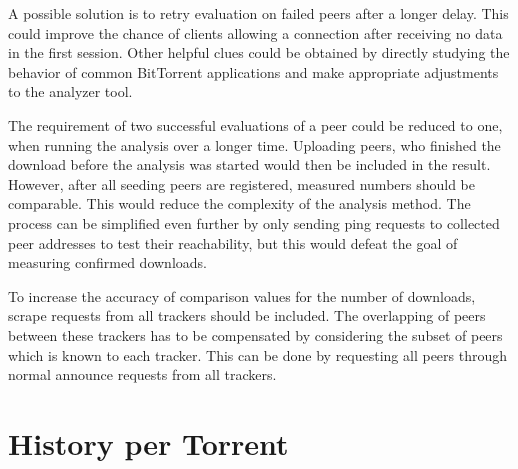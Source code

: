 \documentclass[10pt, a4paper, twoside=false, headsepline]{scrbook}
\renewcommand{\_}{\origunderscore\allowbreak}
\begin{document}
A possible solution is to retry evaluation on failed peers after a longer delay. This could improve the chance of clients allowing a connection after receiving no data in the first session. Other helpful clues could be obtained by directly studying the behavior of common BitTorrent applications and make appropriate adjustments to the analyzer tool.

The requirement of two successful evaluations of a peer could be reduced to one, when running the analysis over a longer time. Uploading peers, who finished the download before the analysis was started would then be included in the result. However, after all seeding peers are registered, measured numbers should be comparable. This would reduce the complexity of the analysis method.
The process can be simplified even further by only sending ping requests to collected peer addresses to test their reachability, but this would defeat the goal of measuring confirmed downloads.

To increase the accuracy of comparison values for the number of downloads, scrape requests from all trackers should be included. The overlapping of peers between these trackers has to be compensated by considering the subset of peers which is known to each tracker. This can be done by requesting all peers through normal announce requests from all trackers.

\ihead{}
\setcounter{biburllcpenalty}{7000}
\setcounter{biburlucpenalty}{8000}
\printbibheading[heading=bibintoc]
\begingroup
\setlength{}
\printbibliography[heading=subbibintoc, title={Literature}, keyword=science]
\printbibliography[heading=subbibintoc, title={Software}, keyword=software]
\printbibliography[heading=subbibintoc, title={Online}, keyword=online]
\endgroup
\printbibliography[heading=subbibintoc, title={Standards}, keyword=standard]

\appendix
\chapter{History per Torrent}
\label{total-history}
\ohead{\rightmark}
\end{document}
